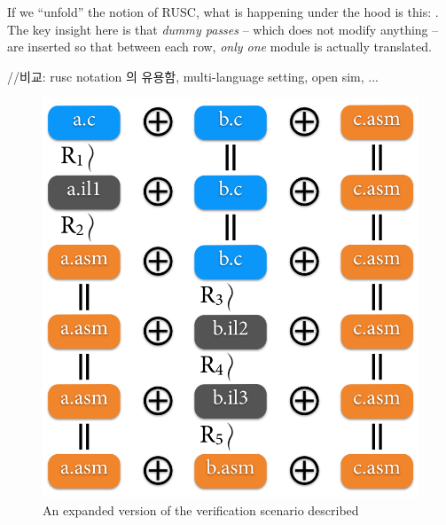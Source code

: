 If we ``unfold'' the notion of RUSC, what is happening under the hood is this: .
The key insight here is that {\it dummy passes} -- which does not modify anything -- are inserted so that between each row, {\it only one} module is actually translated.

//비교: rusc notation 의 유용함, multi-language setting, open sim, ...

\begin{figure}[t]
  \centering
  \includegraphics[width=0.90\linewidth]{images/fig-rusc-inline.png}
  \caption{An expanded version of the verification scenario described }
  \label{fig:rusc-inline}
\end{figure}


